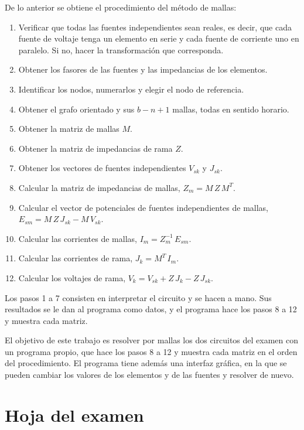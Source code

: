 \documentclass[12pt, letterpaper]{article}
\begin{document}
De lo anterior se obtiene el procedimiento del método de mallas:
\begin{enumerate}
  \item Verificar que todas las fuentes independientes sean reales, es decir, que cada fuente de voltaje tenga un
        elemento en serie y cada fuente de corriente uno en paralelo. Si no, hacer la transformación que corresponda.
  \item Obtener los fasores de las fuentes y las impedancias de los elementos.
  \item Identificar los nodos, numerarlos y elegir el nodo de referencia.
  \item Obtener el grafo orientado y sus $b - n + 1$ mallas, todas en sentido horario.
  \item Obtener la matriz de mallas $M$.
  \item Obtener la matriz de impedancias de rama $Z$.
  \item Obtener los vectores de fuentes independientes $V_{sk}$ y $J_{sk}$.
  \item Calcular la matriz de impedancias de mallas, $Z_m = M\,Z\,M^T$.
  \item Calcular el vector de potenciales de fuentes independientes de mallas, $E_{sm} = M\,Z\,J_{sk} - M\,V_{sk}$.
  \item Calcular las corrientes de mallas, $I_m = Z_m^{-1}\,E_{sm}$.
  \item Calcular las corrientes de rama, $J_k = M^T\,I_m$.
  \item Calcular los voltajes de rama, $V_k = V_{sk} + Z\,J_k - Z\,J_{sk}$.
\end{enumerate}

Los pasos 1 a 7 consisten en interpretar el circuito y se hacen a mano. Sus resultados se le dan al programa como
datos, y el programa hace los pasos 8 a 12 y muestra cada matriz.

El objetivo de este trabajo es resolver por mallas los dos circuitos del examen con un programa propio, que hace los
pasos 8 a 12 y muestra cada matriz en el orden del procedimiento. El programa tiene además una interfaz gráfica, en la
que se pueden cambiar los valores de los elementos y de las fuentes y resolver de nuevo.

\clearpage
\section{Hoja del examen}
\end{document}
